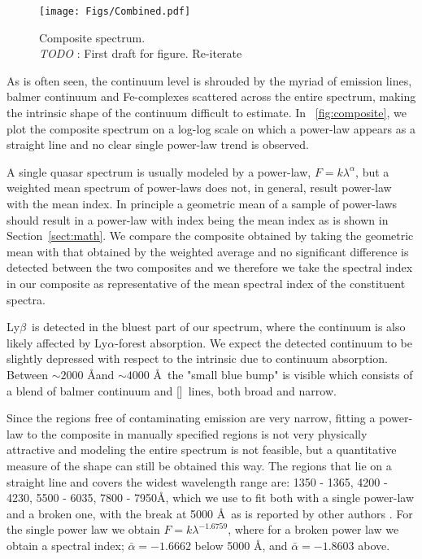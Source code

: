 \documentclass{aa}    %
\newcommand{\figref}[1]{\ref{fig:#1}}
\newcommand{\Fig}[1]{\figurename~\figref{#1}}
\newcommand{\fig}[1]{\Fig{#1}}
\newcommand{\figlabel}[1]{\label{fig:#1}}
\newcommand{\sectionname}{Section}
\newcommand{\Sect}[1]{\sectionname~\ref{sect:#1}}
\newcommand{\sect}[1]{\Sect{#1}}
\newcommand{\lya}{Ly$\alpha$}
\newcommand{\lyb}{Ly$\beta$}
\newcommand{\feii}{[\ion{Fe}{ii}]}
\newcommand{\todo}[3]{{\color{#2}\emph{#1}: #3}}
\newcommand{\jstodo}[1]{\todo{ \\TODO }{red}{#1}}
\begin{document}
 \begin{figure*}[hbtp]
   \centering
   \texttt{[image: Figs/Combined.pdf]}
   \caption[]{Composite spectrum. \jstodo{First draft for figure. Re-iterate}}
  \figlabel{combined}
 \end{figure*}


As is often seen, the continuum level is shrouded by the myriad of emission lines, balmer continuum and Fe-complexes scattered across the entire spectrum, making the intrinsic shape of the continuum difficult to estimate. In \fig{composite}, we plot the composite spectrum on a log-log scale on which a power-law appears as a straight line and no clear single power-law trend is observed. 

 A single quasar spectrum is usually modeled by a power-law, $F = k \lambda^\alpha$, but a weighted mean spectrum of power-laws does not, in general, result power-law with the mean index. In principle a geometric mean of a sample of power-laws should result in a power-law with index being the mean index as is shown in \sect{math}. We compare the composite obtained by taking the geometric mean with that obtained by the weighted average and no significant difference is detected between the two composites and we therefore we take the spectral index in our composite as representative of the mean spectral index of the constituent spectra. 

\lyb ~is detected in the bluest part of our spectrum, where the continuum is also likely affected by \lya-forest absorption. We expect the detected continuum to be slightly depressed with respect to the intrinsic due to continuum absorption. Between $\sim 2000$ \AA and $\sim 4000$ \AA ~the "small blue bump" is visible which consists of a blend of balmer continuum and \feii ~lines, both broad and narrow.

Since the regions free of contaminating emission are very narrow, fitting a power-law to the composite in manually specified regions is not very physically attractive and modeling the entire spectrum is not feasible, but a quantitative measure of the shape can still be obtained this way. The regions that lie on a straight line and covers the widest wavelength range are: 1350 - 1365, 4200 - 4230, 5500 - 6035, 7800 - 7950\AA, which we use to fit both with a single power-law and a broken one, with the break at 5000 \AA~as is reported by other authors \citep{VandenBerk2001}. For the single power law we obtain $F = k\lambda^{-1.6759}$, where for a broken power law we obtain a spectral index; $\bar{\alpha} = -1.6662$ below 5000 \AA, and $\bar{\alpha} = -1.8603$ above. 
\end{document}
